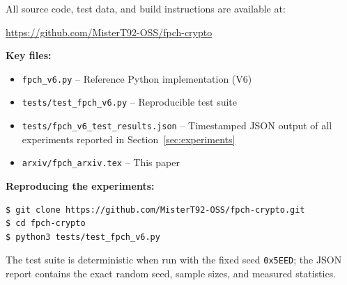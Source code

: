 \documentclass[11pt,a4paper]{article}
\theoremstyle{plain}
\theoremstyle{definition}
\theoremstyle{remark}
\begin{document}
All source code, test data, and build instructions are available at:
\begin{center}
\url{https://github.com/MisterT92-OSS/fpch-crypto}
\end{center}

\noindent\textbf{Key files:}
\begin{itemize}
    \item \texttt{fpch\_v6.py} -- Reference Python implementation (V6)
    \item \texttt{tests/test\_fpch\_v6.py} -- Reproducible test suite
    \item \texttt{tests/fpch\_v6\_test\_results.json} -- Timestamped JSON output of all experiments reported in Section~\ref{sec:experiments}
    \item \texttt{arxiv/fpch\_arxiv.tex} -- This paper
\end{itemize}

\noindent\textbf{Reproducing the experiments:}
\begin{verbatim}
$ git clone https://github.com/MisterT92-OSS/fpch-crypto.git
$ cd fpch-crypto
$ python3 tests/test_fpch_v6.py
\end{verbatim}

\noindent The test suite is deterministic when run with the fixed seed \texttt{0x5EED}; the JSON report contains the exact random seed, sample sizes, and measured statistics.
\end{document}
